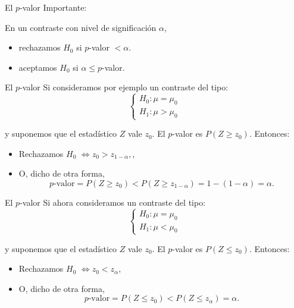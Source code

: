 \documentclass[
  ignorenonframetext,
]{beamer}
\begin{document}
\begin{frame}{El \(p\)-valor}
\protect\hypertarget{el-p-valor-8}{}
Importante:

En un contraste con nivel de significación \(\alpha\),

\begin{itemize}[<+->]
\item
  rechazamos \(H_0\) si \(p\)-valor \(<\alpha\).
\item
  aceptamos \(H_0\) si \(\alpha\leq p\)-valor.
\end{itemize}
\end{frame}

\begin{frame}{El \(p\)-valor}
\protect\hypertarget{el-p-valor-9}{}
Si consideramos por ejemplo un contraste del tipo: \[
\left\{\begin{array}{l}
H_0:\mu=\mu_0\\ H_1:\mu> \mu_0
\end{array}
\right.
\]

y suponemos que el estadístico \(Z\) vale \(z_0\). El \(p\)-valor es
\(P(Z \geq z_0)\). Entonces:

\begin{itemize}[<+->]
\item
  Rechazamos \(H_0\) \(\Longleftrightarrow z_0>z_{1-\alpha},\),
\item
  O, dicho de otra forma,
  \[\mbox{$p$-valor}=P(Z \geq z_0)<P(Z\geq z_{1-\alpha})=1-(1-\alpha)=\alpha.\]
\end{itemize}
\end{frame}

\begin{frame}{El \(p\)-valor}
\protect\hypertarget{el-p-valor-10}{}
Si ahora consideramos un contraste del tipo: \[
\left\{\begin{array}{l}
H_0:\mu=\mu_0\\ H_1:\mu < \mu_0
\end{array}
\right.
\]

y suponemos que el estadístico \(Z\) vale \(z_0\). El \(p\)-valor es
\(P(Z \leq z_0)\). Entonces:

\begin{itemize}[<+->]
\item
  Rechazamos \(H_0\) \(\Longleftrightarrow z_0 < z_{\alpha},\)
\item
  O, dicho de otra forma,
  \[\mbox{$p$-valor}=P(Z \leq z_0) < P(Z\leq z_{\alpha})=\alpha.\]
\end{itemize}
\end{frame}
\end{document}
